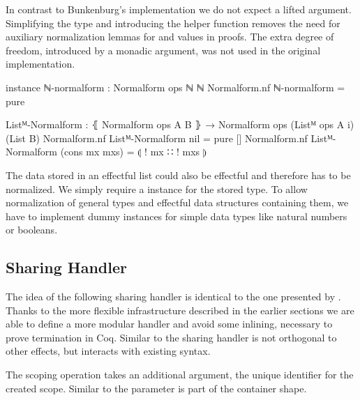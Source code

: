 In contrast to Bunkenburg's implementation we do not expect a lifted argument.
Simplifying the type and introducing the helper function \AgdaFunction{!\_}
removes the need for auxiliary normalization lemmas for
 and  values in
proofs.
The extra degree of freedom, introduced by a monadic argument, was not used in
the original implementation.

\begin{code}
instance
  ℕ-normalform : Normalform ops ℕ ℕ
  Normalform.nf ℕ-normalform = pure

  Listᴹ-Normalform : ⦃ Normalform ops A B ⦄ →
    Normalform ops (Listᴹ ops A {i}) (List B)
  Normalform.nf Listᴹ-Normalform nil            = pure []
  Normalform.nf Listᴹ-Normalform (cons mx mxs)  = ⦇ ! mx ∷ ! mxs ⦈
\end{code}
The data stored in an effectful list could also be effectful and therefore has
to be normalized.
We simply require a  instance for the stored type.
To allow normalization of general types and effectful data structures containing
them, we have to implement dummy instances for simple data types like natural
numbers or booleans.

\subsection{Sharing Handler}

The idea of the following sharing handler is identical to the one presented by
\textcite{bunkenburg2019modeling}.
Thanks to the more flexible infrastructure described in the earlier sections we
are able to define a more modular handler and avoid some inlining, necessary to
prove termination in Coq.
Similar to  the sharing handler is not orthogonal to other
effects, but interacts with existing  syntax.

The scoping operation  takes an additional argument, the
unique identifier for the created scope.
Similar to  the parameter is part of the container shape.

